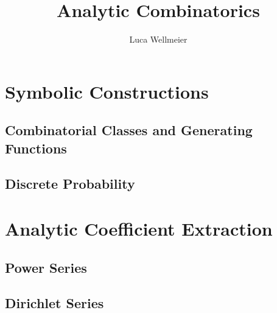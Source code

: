 \documentclass[11pt]{report}
\author{Luca Wellmeier}
\title{Analytic Combinatorics}
\begin{document}

\tableofcontents



\part{Symbolic Constructions}
\chapter{Combinatorial Classes and Generating Functions}

\chapter{Discrete Probability}


\part{Analytic Coefficient Extraction}
\chapter{Power Series}

\chapter{Dirichlet Series}


\printbibliography[
    heading=bibintoc,
    title=References]
\end{document}

